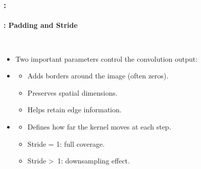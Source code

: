 \documentclass[xcolor=table]{beamer}
\begin{document}
\begin{frame}
	\frametitle{\insertshortsubtitle: \insertsection}
	\framesubtitle{\insertsubsection: Padding and Stride}
	
	\begin{columns}
		
		
		\begin{itemize}
			
			\item Two important parameters control the convolution output:
			
			\item {}
			\begin{itemize}
				\item Adds borders around the image (often zeros).
				\item Preserves spatial dimensions.
				\item Helps retain edge information.
			\end{itemize}
			
			\item {}
			\begin{itemize}
				\item Defines how far the kernel moves at each step.
				\item Stride = 1: full coverage.
				\item Stride \textgreater\ 1: downsampling effect.
			\end{itemize}
			
		\end{itemize}
		
		
		\begin{center}
		\end{center}
		
	\end{columns}
	
\end{frame}
\end{document}
